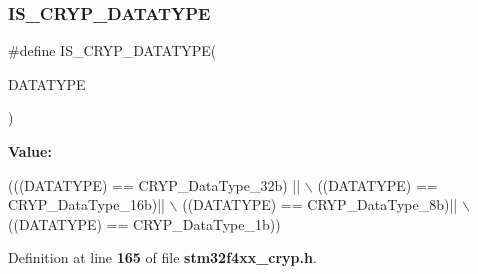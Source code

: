 \mbox{\label{group__CRYP__Data__Type_ga4933d85931b7b8d0b290a1025a666486}} 
\subsubsection{I\+S\+\_\+\+C\+R\+Y\+P\+\_\+\+D\+A\+T\+A\+T\+Y\+PE}
{\footnotesize\ttfamily \#define I\+S\+\_\+\+C\+R\+Y\+P\+\_\+\+D\+A\+T\+A\+T\+Y\+PE(\begin{DoxyParamCaption}\item[{}]{D\+A\+T\+A\+T\+Y\+PE }\end{DoxyParamCaption})}

{\bfseries Value\+:}
\begin{DoxyCode}
(((DATATYPE) == CRYP_DataType_32b) || \(\backslash\)
                                    ((DATATYPE) == CRYP_DataType_16b)|| \(\backslash\)
                                    ((DATATYPE) == CRYP_DataType_8b)|| \(\backslash\)
                                    ((DATATYPE) == CRYP_DataType_1b))
\end{DoxyCode}


Definition at line \textbf{ 165} of file \textbf{ stm32f4xx\+\_\+cryp.\+h}.

